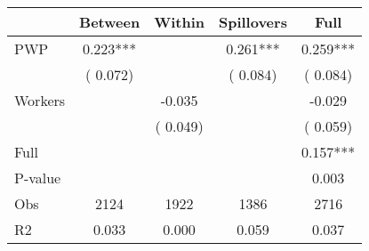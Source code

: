 
\begin{tabular}{l*{4}{c}}\hline&\multicolumn{1}{c}{Between}&\multicolumn{1}{c}{Within}&\multicolumn{1}{c}{Spillovers}&\multicolumn{1}{c}{Full}\\ \hline
 PWP           &              0.223***      &                                               &        0.261*** &         0.259***                            \\ 
                               &        (       0.072)           &                                       &       (       0.084)     &      (       0.084)                                           \\ 
 Workers       &                                               &       -0.035    &                                &            -0.029                            \\ 
                               &                                               & (       0.049)                  &                                        &      (       0.059)                                           \\ 
\hline                                                                                                                                                                                                                                            
 Full                  &                                               &                                               &                                        &             0.157***                                     \\ 
 P-value               &                                               &                                               &                                        &             0.003                                           \\ 
 Obs                   &               2124               &       1922                       &       1386                &              2716                                               \\ 
 R2                    &                      0.033              &              0.000                      &              0.059               &                     0.037                                              \\ 
\hline \end{tabular}                                                                                                                                                                                                              